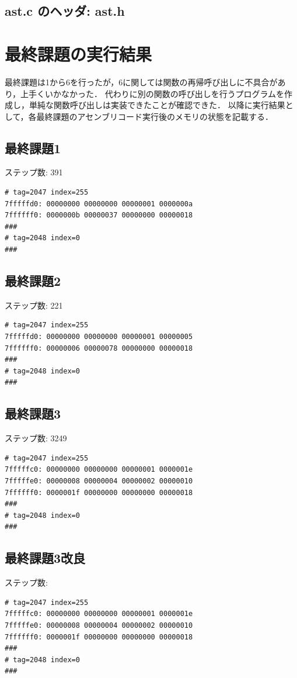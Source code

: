 \documentclass[a4paper,11pt]{jarticle}
\begin{document}
{\subsection{ast.c のヘッダ: ast.h}

\section{最終課題の実行結果}
最終課題は1から6を行ったが，6に関しては関数の再帰呼び出しに不具合があり，上手くいかなかった．
代わりに別の関数の呼び出しを行うプログラムを作成し，単純な関数呼び出しは実装できたことが確認できた．
以降に実行結果として，各最終課題のアセンブリコード実行後のメモリの状態を記載する．
\subsection{最終課題1}
ステップ数: 391 
\begin{verbatim}
# tag=2047 index=255
7fffffd0: 00000000 00000000 00000001 0000000a
7ffffff0: 0000000b 00000037 00000000 00000018
###
# tag=2048 index=0
###
\end{verbatim}
\subsection{最終課題2}
ステップ数: 221 
\begin{verbatim}
# tag=2047 index=255
7fffffd0: 00000000 00000000 00000001 00000005
7ffffff0: 00000006 00000078 00000000 00000018
###
# tag=2048 index=0
###
\end{verbatim}
\subsection{最終課題3}
ステップ数: 3249 
\begin{verbatim}
# tag=2047 index=255
7fffffc0: 00000000 00000000 00000001 0000001e
7fffffe0: 00000008 00000004 00000002 00000010
7ffffff0: 0000001f 00000000 00000000 00000018
###
# tag=2048 index=0
###
\end{verbatim}
\subsection{最終課題3改良}
ステップ数:
\begin{verbatim}
# tag=2047 index=255
7fffffc0: 00000000 00000000 00000001 0000001e
7fffffe0: 00000008 00000004 00000002 00000010
7ffffff0: 0000001f 00000000 00000000 00000018
###
# tag=2048 index=0
###


\end{verbatim}}
\end{document}

